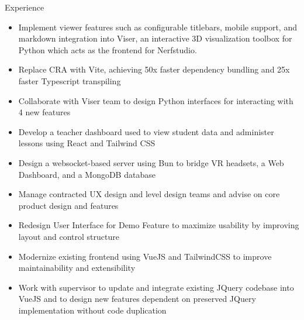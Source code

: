 \documentclass[10pt]{article}
\begin{document}
\begin{section}{Experience}
    \begin{sectionitem}[
        Title={Berkeley AI Research Lab --- Nerfstudio},
        Subtitle={Software Developer},
        City={Berkeley, CA},
        Date={May 2023 -- Present}
    ]
        \begin{itemize}
            \item Implement viewer features such as configurable titlebars, mobile support, and markdown integration into Viser, an interactive 3D visualization toolbox for Python which acts as the frontend for Nerfstudio.
            \item Replace CRA with Vite, achieving 50x faster dependency bundling and 25x faster Typescript transpiling
            \item Collaborate with Viser team to design Python interfaces for interacting with 4 new features
        \end{itemize}
    \end{sectionitem}

    \begin{sectionitem}[
        Title={Leap XR, LLC},
        Subtitle={Cofounder and Full Stack Developer},
        City={Fresno, CA},
        Date={December 2019 -- Present}
    ]
        \begin{itemize}
            \item Develop a teacher dashboard used to view student data and administer lessons using React and Tailwind CSS
            \item Design a websocket-based server using Bun to bridge VR headsets, a Web Dashboard, and a MongoDB database
            \item Manage contracted UX design and level design teams and advise on core product design and features            
        \end{itemize}
    \end{sectionitem}

    \begin{sectionitem}[
        Title={Robert Bosch, LLC},
        Subtitle={Research Intern, GS/PEO --- Nevonex},
        City={Sunnyvale, CA},
        Date={October 2022 -- March 2023}
    ]
        \begin{itemize}
            \item Redesign User Interface for Demo Feature to maximize usability by improving layout and control structure
            \item Modernize existing frontend using VueJS and TailwindCSS to improve maintainability and extensibility
            \item Work with supervisor to update and integrate existing JQuery codebase into VueJS and to design new features dependent on preserved JQuery implementation without code duplication           
        \end{itemize}
    \end{sectionitem}
\end{section}
\end{document}
